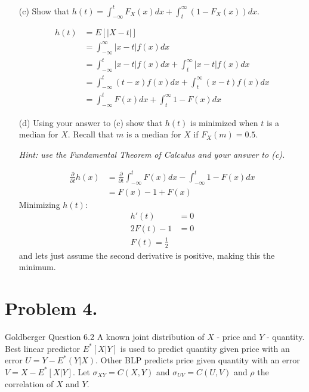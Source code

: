 \documentclass{article}
\newcommand{\1}{\mathbf{1}}
\begin{document}
\begin{enumerate}
    \item[(c)] Show that $h(t) =  \int_{-\infty}^t F_X(x) dx + \int_t^\infty(1 - F_X(x))dx$.
    
    \begin{align*}
        h(t) &= E[|X-t|] \\
        &= \int_{-\infty}^\infty |x-t| f(x) dx \\
        &= \int_{-\infty}^t |x-t| f(x) dx + \int_t^\infty |x-t|f(x)dx \\
        &= \int_{-\infty}^t (t-x) f(x) dx + \int_t^\infty (x-t)f(x)dx \\
        &=  \int_{-\infty}^t F(x) dx + \int_t^\infty 1-F(x) dx 
    \end{align*}

    \newpage
    \item[(d)] Using your answer to (c) show that $h(t)$ is minimized when $t$ is a median for $X$. Recall that $m$ is a median for $X$ if $F_X(m) = 0.5$.\par
            {\it Hint: use the Fundamental Theorem of Calculus and your answer to (c).}
        
    \begin{align*}
        \frac{\partial}{\partial t}h(x) &= \frac{\partial}{\partial t}  \int_{-\infty}^t F(x) dx - \int_{-\infty}^t 1-F(x) dx  \\
        &= F(x) - 1 + F(x) 
    \end{align*}
    Minimizing $h(t)$:
    \begin{align*}
    h'(t) &= 0 \\
    2F(t) - 1 &= 0 \\
    F(t) = \frac{1}{2}
    \end{align*}
    and lets just assume the second derivative is positive, making this the minimum. 
    
\end{enumerate}



\newpage
\section*{Problem 4.} Goldberger Question 6.2
A known joint distribution of $X$ - price and $Y$ - quantity. Best linear predictor $E^*[X|Y]$ is used to predict quantity given price with an error $U = Y-E^*(Y|X)$. Other BLP predicts price given quantity with an error $V = X - E^*[X|Y]$. Let $\sigma_{XY} = C(X,Y)$ and $\sigma_{UV} = C(U,V)$ and $\rho$ the correlation of $X$ and $Y$. 
\end{document}
